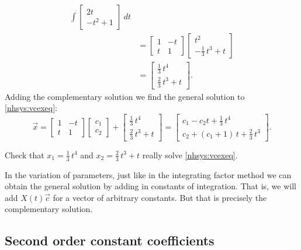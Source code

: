\documentclass[12pt]{book}
\begin{document}
\begin{example}
\begin{equation*}
\begin{split}
\int
\begin{bmatrix}
2t \\
-t^2 + 1
\end{bmatrix} 
~dt
\\
& =
\begin{bmatrix}
1 & -t \\
t & 1
\end{bmatrix} 
\begin{bmatrix}
t^2 \\
-\frac{1}{3}\,t^3 + t
\end{bmatrix} 
\\
& =
\begin{bmatrix}
\frac{1}{3}\,t^4 \\
\frac{2}{3}\,t^3 + t
\end{bmatrix}  .
\end{split}
\end{equation*}
Adding the complementary solution we find the general solution
to \eqref{nhsys:vcexeq}:
\begin{equation*}
\vec{x} =
\begin{bmatrix}
1 & -t \\
t & 1
\end{bmatrix}
\begin{bmatrix}
c_1 \\ c_2
\end{bmatrix}
+
\begin{bmatrix}
\frac{1}{3}\,t^4 \\
\frac{2}{3}\,t^3 + t
\end{bmatrix}
=
\begin{bmatrix}
c_1 - c_2 t
+
\frac{1}{3}\,t^4 \\
c_2 + 
(c_1 + 1)\, t
+
\frac{2}{3}\,t^3
\end{bmatrix} .
\end{equation*}
\end{example}

\begin{exercise}
Check that $x_1 = 
\frac{1}{3}\,t^4$ and $x_2 = 
\frac{2}{3}\,t^3 + t$ really solve
\eqref{nhsys:vcexeq}.
\end{exercise}

In the variation of parameters, just like in the integrating factor method
we can obtain the general solution by adding in constants of integration.
That is, we will add $X(t) \vec{c}$ for a vector of arbitrary constants.  But
that is precisely the complementary solution.

\subsection{Second order constant coefficients}
\end{document}
